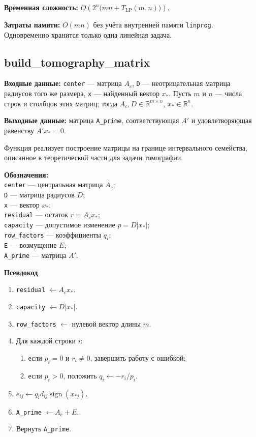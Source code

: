 \documentclass[12pt,a4paper]{article}
\numberwithin{equation}{section}
\newcommand{\theorypart}[1]{%
    \par\medskip
    \noindent\textbf{#1}\par\nopagebreak\smallskip
}
\begin{document}
\smallskip
\noindent
\textbf{Временная сложность:}
$O\!\left(2^n\bigl(mn+T_{\mathrm{LP}}(m,n)\bigr)\right)$.

\smallskip
\noindent
\textbf{Затраты памяти:} $O(mn)$ без учёта внутренней памяти
\texttt{linprog}. Одновременно хранится только одна линейная задача.

\subsection{build\_tomography\_matrix}

\noindent
\textbf{Входные данные:} \texttt{center} --- матрица $A_c$,
\texttt{D} --- неотрицательная матрица радиусов того же размера,
\texttt{x} --- найденный вектор $x_*$. Пусть $m$ и $n$ --- числа строк
и столбцов этих матриц; тогда $A_c,D\in\mathbb{R}^{m\times n}$,
$x_*\in\mathbb{R}^n$.

\noindent
\textbf{Выходные данные:} матрица \texttt{A\_prime}, соответствующая
$A'$ и удовлетворяющая равенству $A'x_*=0$.

\medskip
\noindent
Функция реализует построение матрицы на границе интервального семейства,
описанное в теоретической части для задачи томографии.

\smallskip
\noindent
\textbf{Обозначения:}\\
\texttt{center} --- центральная матрица $A_c$;\\
\texttt{D} --- матрица радиусов $D$;\\
\texttt{x} --- вектор $x_*$;\\
\texttt{residual} --- остаток $r=A_cx_*$;\\
\texttt{capacity} --- допустимое изменение $p=D|x_*|$;\\
\texttt{row\_factors} --- коэффициенты $q_i$;\\
\texttt{E} --- возмущение $E$;\\
\texttt{A\_prime} --- матрица $A'$.

\theorypart{Псевдокод}

\begin{enumerate}
    \setlength{\itemsep}{0.3\baselineskip}
    \item \texttt{residual} $\gets A_cx_*$.
    \item \texttt{capacity} $\gets D|x_*|$.
    \item \texttt{row\_factors} $\gets$ нулевой вектор длины $m$.
    \item Для каждой строки $i$:
    \begin{enumerate}
        \item если $p_i=0$ и $r_i\neq0$, завершить работу с ошибкой;
        \item если $p_i>0$, положить $q_i\gets-r_i/p_i$.
    \end{enumerate}
    \item $e_{ij}\gets q_i d_{ij}\operatorname{sign}(x_{*j})$.
    \item \texttt{A\_prime} $\gets A_c+E$.
    \item Вернуть \texttt{A\_prime}.
\end{enumerate}
\end{document}
